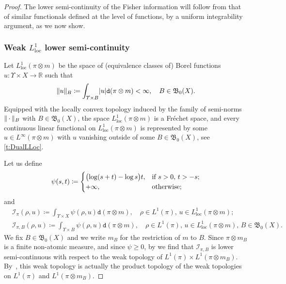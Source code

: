 \documentclass[10pt]{amsart}
\theoremstyle{definition}
\theoremstyle{remark}
\DeclarePairedDelimiter{\paren}{\lparen}{\rparen}
\DeclarePairedDelimiter{\abs}{\lvert}{\rvert}
\DeclarePairedDelimiter{\norm}{\lVert}{\rVert}
\newcommand{\emparg}{\,\cdot\,}
\begin{document}
\begin{proof}
The lower semi-continuity of the Fisher information will follow from that of similar functionals defined at the level of functions, by a uniform integrability argument, as we now show.

\subsubsection*{Weak $L^1_{\mathrm{loc}}$ lower semi-continuity}

Let $L^{1}_{\mathrm{loc}}(\pi \otimes m)$ be the space of (equivalence classes of) Borel functions $u \colon \varUpsilon \times X \to \mathbb{R}$ such that
\begin{equation*}
\norm{u}_{B} \coloneq \int_{\varUpsilon \times B} \abs{u} \mathtt{d}(\pi \otimes m) < \infty, \quad B \in \mathfrak{B}_{0}(X).
\end{equation*}
Equipped with the locally convex topology induced by the family of semi-norms $\norm{\emparg}_{B}$ with $B \in \mathfrak{B}_{0}(X)$, the space $L^{1}_{\mathrm{loc}}(\pi \otimes m)$ is a Fréchet space, and every continuous linear functional on $L^{1}_{\mathrm{loc}}(\pi \otimes m)$ is represented by some $u \in L^{\infty}(\pi \otimes m)$ with $u$ vanishing outside of some $B \in \mathfrak{B}_{0}(X)$, see \cref{t:DualLLoc}.

Let us define
\begin{equation*}
\psi(s,t) \coloneq
\begin{cases}
\paren[\big]{\log(s+t) - \log s} t, & \text{if } s > 0,\, t > - s;
\\ +\infty, & \text{otherwise;}
\end{cases}
\end{equation*}
and
\begin{align*}
& \mathcal{I}_{\pi}(\rho, u) \coloneq \int_{\varUpsilon \times X} \psi(\rho,u) \mathtt{d} (\pi \otimes m), \quad \rho \in L^{1}(\pi),\, u \in L^{1}_{\mathrm{loc}}(\pi \otimes m); \\
& \mathcal{I}_{\pi,B}(\rho, u) \coloneq \int_{\varUpsilon \times B} \psi(\rho, u) \mathtt{d} (\pi \otimes m), \quad \rho \in L^{1}(\pi),\, u \in L_{\mathrm{loc}}^{1}(\pi \otimes m),\, B\in\mathfrak{B}_0(X).
\end{align*}
We fix $B \in \mathfrak{B}_{0}(X)$ and we write $m_{B}$ for the restriction of $m$ to $B$.
Since $\pi \otimes m_{B}$ is a finite non-atomic measure, and since $\psi \geq 0$, by \cite[Th.\,1]{Ioffe} we find that $\mathcal{I}_{\pi,B}$ is lower semi-continuous with respect to the weak topology of $L^{1}(\pi) \times L^{1}(\pi \otimes m_{B})$.
By~\cite[II, p.\,53, Prop.\,8]{BourbakiEVT}, this weak topology is actually the product topology of the weak topologies on $L^1(\pi)$ and $L^1(\pi\otimes m_{B})$.


\end{proof}
\end{document}
